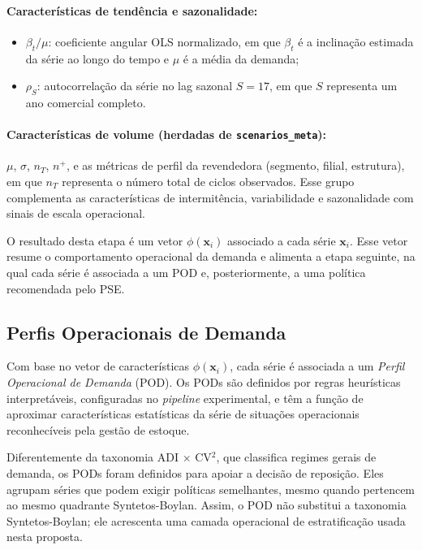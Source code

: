 \paragraph{Características de tendência e sazonalidade:}
\begin{itemize}
  \item $\beta_t / \mu$: coeficiente angular OLS normalizado, em que $\beta_t$ é a inclinação estimada da série ao longo do tempo e $\mu$ é a média da demanda;
  \item $\rho_S$: autocorrelação da série no lag sazonal $S = 17$, em que $S$ representa um ano comercial completo.
\end{itemize}

\paragraph{Características de volume (herdadas de \texttt{scenarios\_meta}):}
$\mu$, $\sigma$, $n_T$, $n^+$, e as métricas de perfil da revendedora (segmento, filial, estrutura), em que $n_T$ representa o número total de ciclos observados. Esse grupo complementa as características de intermitência, variabilidade e sazonalidade com sinais de escala operacional.

O resultado desta etapa é um vetor $\phi(\mathbf{x}_i)$ associado a cada série $\mathbf{x}_i$. Esse vetor resume o comportamento operacional da demanda e alimenta a etapa seguinte, na qual cada série é associada a um POD e, posteriormente, a uma política recomendada pelo PSE.

\subsection{Perfis Operacionais de Demanda}

Com base no vetor de características $\phi(\mathbf{x}_i)$, cada série é associada a um \textit{Perfil Operacional de Demanda} (POD). Os PODs são definidos por regras heurísticas interpretáveis, configuradas no \textit{pipeline} experimental, e têm a função de aproximar características estatísticas da série de situações operacionais reconhecíveis pela gestão de estoque.

Diferentemente da taxonomia ADI $\times$ CV$^2$, que classifica regimes gerais de demanda, os PODs foram definidos para apoiar a decisão de reposição. Eles agrupam séries que podem exigir políticas semelhantes, mesmo quando pertencem ao mesmo quadrante Syntetos-Boylan. Assim, o POD não substitui a taxonomia Syntetos-Boylan; ele acrescenta uma camada operacional de estratificação usada nesta proposta.

